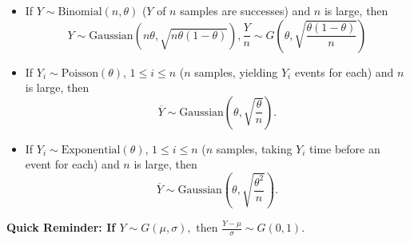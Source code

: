\documentclass[a4paper,12pt]{article}
\begin{document}
\begin{itemize}
    \item If $Y \sim \text{Binomial}(n, \theta)$ ($Y$ of $n$ samples are successes) and $n$ is large, then 
    \[
    Y \sim \text{Gaussian} \left(n\theta, \sqrt{n\theta(1-\theta)}\right), \frac{Y}{n} \sim G \left(\theta, \sqrt{\frac{\theta(1-\theta)}{n}} \right)
    \]

    \item If $Y_i \sim \text{Poisson}(\theta)$, $1 \leq i \leq n$ ($n$ samples, yielding $Y_i$ events for each) and $n$ is large, then 
    \[
    \overline{Y} \sim \text{Gaussian} \left(\theta, \sqrt{\frac{\theta}{n}}\right).
    \]

    \item If $Y_i \sim \text{Exponential}(\theta)$, $1 \leq i \leq n$ ($n$ samples, taking $Y_i$ time before an event for each) and $n$ is large, then 
    \[
    \overline{Y} \sim \text{Gaussian} \left(\theta, \sqrt{\frac{\theta^2}{n}}\right).
    \]
\end{itemize}
\textbf{Quick Reminder: If $Y \sim G(\mu, \sigma), \text{ then } \frac{Y - \mu}{\sigma} \sim G(0, 1)$}.
\end{document}
